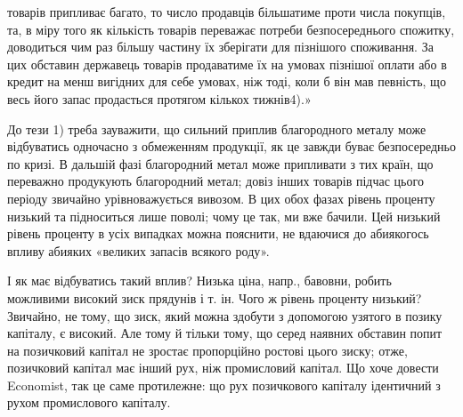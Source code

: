 \parcont{}  %
товарів припливає багато, то число продавців більшатиме проти числа покупців, та,
в міру того як кількість товарів переважає потреби безпосереднього спожитку,
доводиться чим раз більшу частину їх зберігати для пізнішого споживання. За цих
обставин державець товарів продаватиме їх на умовах пізнішої оплати або
в кредит на менш вигідних для себе умовах, ніж тоді, коли б він мав певність,
що весь його запас продасться протягом кількох тижнів4).»

До тези 1) треба зауважити, що сильний приплив благородного металу
може відбуватись одночасно з обмеженням продукції, як це завжди
буває безпосередньо по кризі. В дальшій фазі благородний метал може припливати
з тих країн, що переважно продукують благородний метал; довіз
інших товарів підчас цього періоду звичайно урівноважується вивозом. В цих
обох фазах рівень проценту низький та підноситься лише поволі; чому це так,
ми вже бачили. Цей низький рівень проценту в усіх випадках можна пояснити,
не вдаючися до абиякогось впливу абияких «великих запасів всякого роду».

І як має відбуватись такий вплив? Низька ціна, напр., бавовни, робить можливими
високий зиск прядунів і т. ін. Чого ж рівень проценту низький? Звичайно,
не тому, що зиск, який можна здобути з допомогою узятого в позику
капіталу, є високий. Але тому й тільки тому, що серед наявних обставин попит
на позичковий капітал не зростає пропорційно ростові цього зиску; отже, позичковий
капітал має інший рух, ніж промисловий капітал. Що хоче довести
Economist, так це саме протилежне: що рух позичкового капіталу ідентичний
з рухом промислового капіталу.

